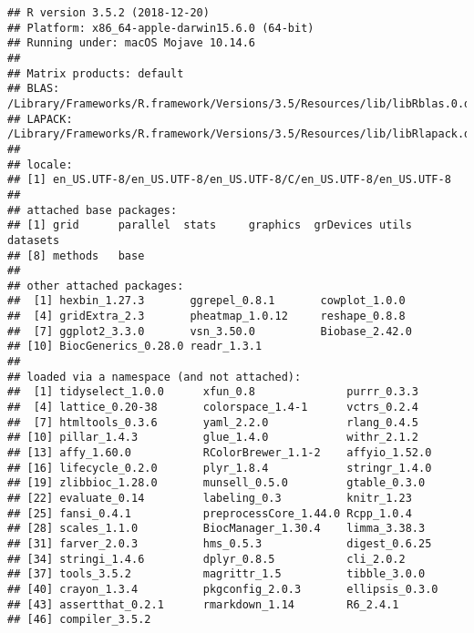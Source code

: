 \documentclass[]{article}
\begin{document}
\begin{verbatim}
## R version 3.5.2 (2018-12-20)
## Platform: x86_64-apple-darwin15.6.0 (64-bit)
## Running under: macOS Mojave 10.14.6
## 
## Matrix products: default
## BLAS: /Library/Frameworks/R.framework/Versions/3.5/Resources/lib/libRblas.0.dylib
## LAPACK: /Library/Frameworks/R.framework/Versions/3.5/Resources/lib/libRlapack.dylib
## 
## locale:
## [1] en_US.UTF-8/en_US.UTF-8/en_US.UTF-8/C/en_US.UTF-8/en_US.UTF-8
## 
## attached base packages:
## [1] grid      parallel  stats     graphics  grDevices utils     datasets 
## [8] methods   base     
## 
## other attached packages:
##  [1] hexbin_1.27.3       ggrepel_0.8.1       cowplot_1.0.0      
##  [4] gridExtra_2.3       pheatmap_1.0.12     reshape_0.8.8      
##  [7] ggplot2_3.3.0       vsn_3.50.0          Biobase_2.42.0     
## [10] BiocGenerics_0.28.0 readr_1.3.1        
## 
## loaded via a namespace (and not attached):
##  [1] tidyselect_1.0.0      xfun_0.8              purrr_0.3.3          
##  [4] lattice_0.20-38       colorspace_1.4-1      vctrs_0.2.4          
##  [7] htmltools_0.3.6       yaml_2.2.0            rlang_0.4.5          
## [10] pillar_1.4.3          glue_1.4.0            withr_2.1.2          
## [13] affy_1.60.0           RColorBrewer_1.1-2    affyio_1.52.0        
## [16] lifecycle_0.2.0       plyr_1.8.4            stringr_1.4.0        
## [19] zlibbioc_1.28.0       munsell_0.5.0         gtable_0.3.0         
## [22] evaluate_0.14         labeling_0.3          knitr_1.23           
## [25] fansi_0.4.1           preprocessCore_1.44.0 Rcpp_1.0.4           
## [28] scales_1.1.0          BiocManager_1.30.4    limma_3.38.3         
## [31] farver_2.0.3          hms_0.5.3             digest_0.6.25        
## [34] stringi_1.4.6         dplyr_0.8.5           cli_2.0.2            
## [37] tools_3.5.2           magrittr_1.5          tibble_3.0.0         
## [40] crayon_1.3.4          pkgconfig_2.0.3       ellipsis_0.3.0       
## [43] assertthat_0.2.1      rmarkdown_1.14        R6_2.4.1             
## [46] compiler_3.5.2
\end{verbatim}
\end{document}
